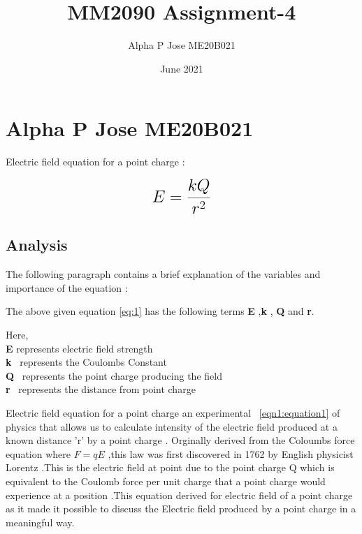 \documentclass[a4paper, 12pt]{article}
\begin{document}
\title{MM2090 Assignment-4}
\author{Alpha P Jose ME20B021}
\date{June 2021}
\maketitle

\section{Alpha P Jose ME20B021}

Electric field equation for a point charge :  

\begin{equation}
 {\LARGE{\textbf{$E =\frac{kQ}{{r^2}}$}}}
 \label{eqn1:equation1}
\end{equation}


\subsection{Analysis}
The following paragraph contains a brief explanation of the variables and  importance of the equation :
\begin{itemize}

    {\normalsize {The above given equation \ref{eq:1}  has the following terms \textbf{E} ,\textbf{k} , \textbf{Q} and \textbf{r}.}}

{\normalsize { Here,}}\\
{\normalsize {\textbf{E} represents electric field strength }}\\
{\normalsize {\textbf{k} \  represents the Coulombs Constant}}\\
{\normalsize {\textbf{Q} \  represents the point charge producing the field}}\\
{\normalsize{\textbf{r} \ represents the distance from point charge}}
\end{itemize}


Electric field equation for a point charge an experimental ~\ref{eqn1:equation1} of physics that allows us to calculate intensity of the electric field produced at a known distance 'r' by a point charge . Orginally derived from the Coloumbs force equation where $F=qE$ ,this law was first discovered in 1762 by English physicist Lorentz .This is the electric field at point due to the point charge Q which is equivalent  to the Coulomb force per unit charge that a point charge would experience at a position .This equation derived for electric field of a point charge as it made it possible to discuss the Electric field produced by a point charge in a meaningful way.
\end{document}
